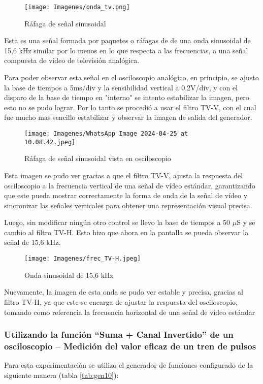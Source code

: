 \begin{figure}[H]
    \centering
        \texttt{[image: Imagenes/onda\_tv.png]}
    \caption{Ráfaga de señal sinusoidal}
\label{fig::TrenDePulsosOsc}
\end{figure}

Esta es una señal formada por paquetes o ráfagas de de una onda sinusoidal de 15,6 kHz similar por lo menos en lo que respecta a las frecuencias, a una señal compuesta de vídeo de televisión analógica.

Para poder observar esta señal en el osciloscopio analógico, en principio, se ajusto la base de tiempos a 5ms/div y la sensibilidad vertical a 0.2V/div, y con el disparo de la base de tiempo en "interno" se intento estabilizar la imagen, pero esto no se pudo lograr. Por lo tanto se procedió a usar el filtro TV-V, con el cual fue mucho mas sencillo estabilizar y observar la imagen de salida del generador.

\begin{figure}[H]
    \centering
        \texttt{[image: Imagenes/WhatsApp Image 2024-04-25 at 10.08.42.jpeg]}
    \caption{Ráfaga de señal sinusoidal vista en osciloscopio}
\label{fig::TrenDePulsosOsc}
\end{figure}

Esta imagen se pudo ver gracias a que el filtro TV-V, ajusta la respuesta del osciloscopio a la frecuencia vertical de una señal de vídeo estándar, garantizando que este pueda mostrar correctamente la forma de onda de la señal de vídeo y sincronizar las señales verticales para obtener una representación visual precisa. 

Luego, sin modificar ningún otro control se llevo la base de tiempos a 50 $\mu$S y se cambio al filtro TV-H. Esto hizo que ahora en la pantalla se pueda observar la señal de 15,6 kHz.

\begin{figure}[H]
    \centering
        \texttt{[image: Imagenes/frec\_TV-H.jpeg]}
    \caption{Onda sinusoidal de 15,6 kHz}
\label{fig::TrenDePulsosOsc}
\end{figure}

Nuevamente, la imagen de esta onda se pudo ver estable y precisa, gracias al filtro TV-H, ya que este se encarga de ajustar la respuesta del osciloscopio, tomando como referencia la frecuencia horizontal de una señal de vídeo estándar 

\vspace{0.5cm}
\subsubsection{Utilizando la función “Suma + Canal Invertido” de un osciloscopio – Medición del valor eficaz de un tren de pulsos}
Para esta experimentación se utilizo el generador de funciones configurado de la siguiente manera (tabla \ref{tab:gen10}):

